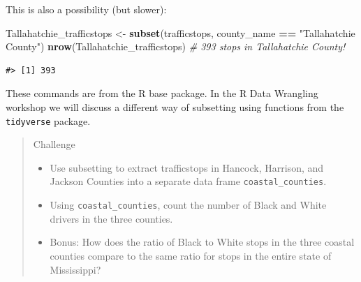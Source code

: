 \documentclass[]{book}
\newenvironment{Shaded}{\begin{snugshade}}{\end{snugshade}}
\newcommand{\KeywordTok}[1]{\textcolor[rgb]{0.13,0.29,0.53}{\textbf{#1}}}
\newcommand{\StringTok}[1]{\textcolor[rgb]{0.31,0.60,0.02}{#1}}
\newcommand{\CommentTok}[1]{\textcolor[rgb]{0.56,0.35,0.01}{\textit{#1}}}
\newcommand{\OperatorTok}[1]{\textcolor[rgb]{0.81,0.36,0.00}{\textbf{#1}}}
\newcommand{\NormalTok}[1]{#1}
\providecommand{\tightlist}{%
  \setlength{\itemsep}{0pt}\setlength{\parskip}{0pt}}
\theoremstyle{definition}
\theoremstyle{definition}
\theoremstyle{remark}
\begin{document}
\begin{Shaded}
\end{Shaded}

This is also a possibility (but slower):

\begin{Shaded}
\begin{Highlighting}[]
\NormalTok{Tallahatchie_trafficstops <-}\StringTok{ }\KeywordTok{subset}\NormalTok{(trafficstops, county_name }\OperatorTok{==}\StringTok{ "Tallahatchie County"}\NormalTok{)}
\KeywordTok{nrow}\NormalTok{(Tallahatchie_trafficstops) }\CommentTok{# 393 stops in Tallahatchie County!}
\end{Highlighting}
\end{Shaded}

\begin{verbatim}
#> [1] 393
\end{verbatim}

These commands are from the R base package. In the R Data Wrangling
workshop we will discuss a different way of subsetting using functions
from the \texttt{tidyverse} package.

\begin{quote}
Challenge

\begin{itemize}
\tightlist
\item
  Use subsetting to extract trafficstops in Hancock, Harrison, and
  Jackson Counties into a separate data frame
  \texttt{coastal\_counties}.
\item
  Using \texttt{coastal\_counties}, count the number of Black and White
  drivers in the three counties.
\item
  Bonus: How does the ratio of Black to White stops in the three coastal
  counties compare to the same ratio for stops in the entire state of
  Mississippi?
\end{itemize}
\end{quote}
\end{document}
